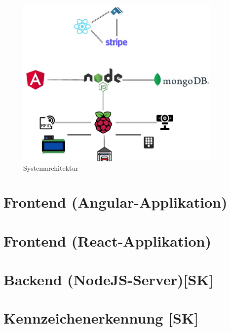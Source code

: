 \begin{figure}[h]
    \centering
    \includegraphics[width=10cm]{pics/APERTASystemarchitektur.jpg}
    \caption{Systemarchitektur}
    \end{figure}
  \cite{RaspberryImage}

\section{Frontend (Angular-Applikation)}

\section{Frontend (React-Applikation)}

\section{Backend (NodeJS-Server)[SK]}

\section{Kennzeichenerkennung [SK]}
